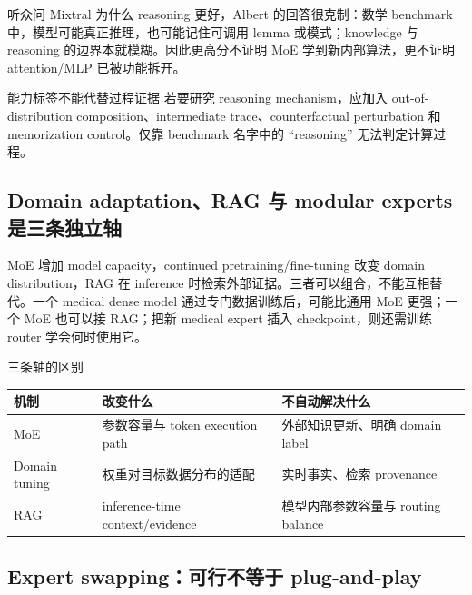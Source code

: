 \documentclass[a4paper]{article}
\begin{document}
听众问 Mixtral 为什么 reasoning 更好，Albert 的回答很克制：数学 benchmark 中，模型可能真正推理，也可能记住可调用 lemma 或模式；knowledge 与 reasoning 的边界本就模糊。因此更高分不证明 MoE 学到新内部算法，更不证明 attention/MLP 已被功能拆开。

\begin{warningbox}{能力标签不能代替过程证据}
若要研究 reasoning mechanism，应加入 out-of-distribution composition、intermediate trace、counterfactual perturbation 和 memorization control。仅靠 benchmark 名字中的 “reasoning” 无法判定计算过程。
\end{warningbox}


\subsection{Domain adaptation、RAG 与 modular experts 是三条独立轴}

MoE 增加 model capacity，continued pretraining/fine-tuning 改变 domain distribution，RAG 在 inference 时检索外部证据。三者可以组合，不能互相替代。一个 medical dense model 通过专门数据训练后，可能比通用 MoE 更强；一个 MoE 也可以接 RAG；把新 medical expert 插入 checkpoint，则还需训练 router 学会何时使用它。

\begin{knowledgebox}{三条轴的区别}
\begin{tabularx}{\textwidth}{L{0.18\textwidth} L{0.27\textwidth} X}
\toprule
机制 & 改变什么 & 不自动解决什么 \\
\midrule
MoE & 参数容量与 token execution path & 外部知识更新、明确 domain label \\
Domain tuning & 权重对目标数据分布的适配 & 实时事实、检索 provenance \\
RAG & inference-time context/evidence & 模型内部参数容量与 routing balance \\
\bottomrule
\end{tabularx}
\end{knowledgebox}


\subsection{Expert swapping：可行不等于 plug-and-play}
\end{document}
